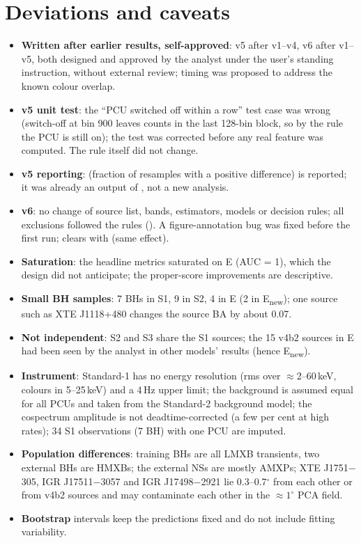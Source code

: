 \section{Deviations and caveats}\label{sec:p3caveats}
\begin{itemize}
\item \textbf{Written after earlier results, self-approved}: v5 after v1--v4, v6 after v1--v5, both designed and approved by
the analyst under the user's standing instruction, without external review; timing was proposed to address the known
colour overlap.
\item \textbf{v5 unit test}: the ``PCU switched off within a row'' test case was wrong (switch-off at bin 900 leaves counts in
the last 128-bin block, so by the rule the PCU is still on); the test was corrected before any real feature was computed.
The rule itself did not change.
\item \textbf{v5 reporting}:  (fraction of resamples with a positive difference) is reported; it was
already an output of , not a new analysis.
\item \textbf{v6}: no change of source list, bands, estimators, models or decision rules; all exclusions followed the rules
(). A figure-annotation bug was fixed before the first run;  clears
 with  (same effect).
\item \textbf{Saturation}: the headline metrics saturated on E (AUC = 1), which the design did not anticipate; the proper-score
improvements are descriptive.
\item \textbf{Small BH samples}: 7 BHs in S1, 9 in S2, 4 in E (2 in E\textsubscript{new}); one source such as XTE J1118+480 changes the source BA
by about 0.07.
\item \textbf{Not independent}: S2 and S3 share the S1 sources; the 15 v4b2 sources in E had been seen by the analyst in other
models' results (hence E\textsubscript{new}).
\item \textbf{Instrument}: Standard-1 has no energy resolution (rms over $\approx$2--60\,keV, colours in 5--25\,keV) and a 4\,Hz
upper limit; the background is assumed equal for all PCUs and taken from the Standard-2 background model; the cospectrum
amplitude is not deadtime-corrected (a few per cent at high rates); 34 S1 observations (7 BH) with one PCU are imputed.
\item \textbf{Population differences}: training BHs are all LMXB transients, two external BHs are HMXBs; the external NSs
are mostly AMXPs; XTE J1751$-$305, IGR J17511$-$3057 and IGR J17498$-$2921 lie 0.3--0.7$^\circ$ from each other or from v4b2
sources and may contaminate each other in the $\approx1^\circ$ PCA field.
\item \textbf{Bootstrap} intervals keep the predictions fixed and do not include fitting variability.
\end{itemize}

